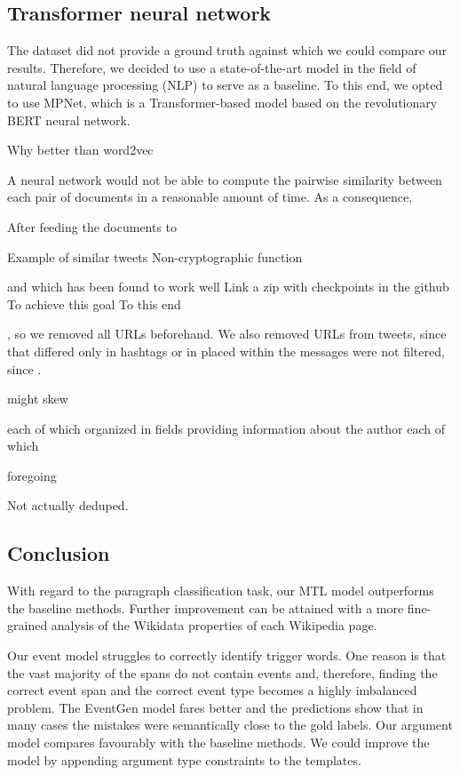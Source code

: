 \documentclass[runningheads]{llncs}
\begin{document}
\subsection{Transformer neural network}
\label{subsec:models:transformer}

The dataset did not provide a ground truth against which we could compare our results. Therefore, we decided to use a state-of-the-art model in the field of natural language processing (NLP) to serve as a baseline. To this end, we opted to use MPNet, which is a Transformer-based model based on the revolutionary BERT neural network. 

Why better than word2vec

A neural network would not be able to compute the pairwise similarity between each pair of documents in a reasonable amount of time. As a consequence, 

After feeding the documents to 

Example of similar tweets
Non-cryptographic function

and which has been found to work well  
Link a zip with checkpoints in the github
To achieve this goal
To this end

, so we removed all URLs 
beforehand. 
We also removed URLs from tweets, since that differed only in hashtags or in  placed within the messages were not filtered, since . 

might skew

each of which organized in fields providing information about the author
each of which  

foregoing

Not actually deduped.

\subsection{Conclusion}

With regard to the paragraph classification task, our MTL model outperforms the baseline methods. Further improvement can be attained with a more fine-grained analysis of the Wikidata properties of each Wikipedia page.

Our event model struggles to correctly identify trigger words. One reason is that the vast majority of the spans do not contain events and, therefore, finding the correct event span and the correct event type becomes a highly imbalanced problem. The EventGen model fares better and the predictions show that in many cases the mistakes were semantically close to the gold labels. Our argument model compares favourably with the baseline methods. We could improve the model by appending argument type constraints to the templates.



\end{document}
